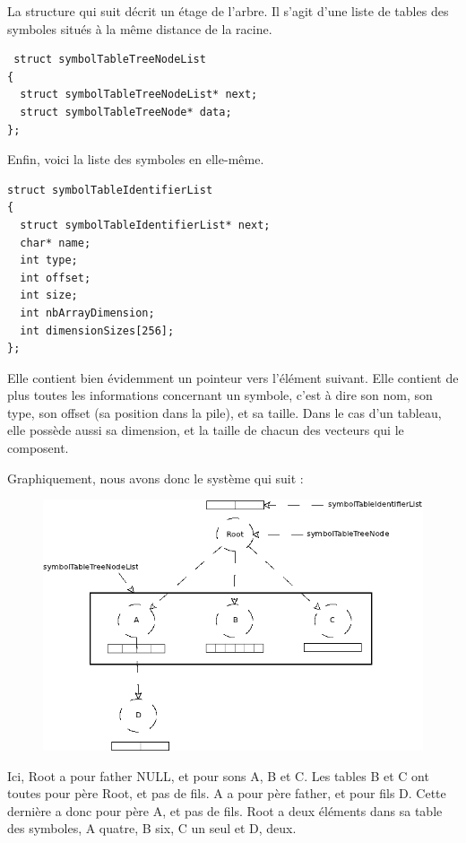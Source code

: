 La structure qui suit décrit un étage de l'arbre. Il s'agit d'une liste de tables des symboles situés à la même distance de la racine.

\begin{verbatim} 
 struct symbolTableTreeNodeList
{
  struct symbolTableTreeNodeList* next;
  struct symbolTableTreeNode* data;
};
\end{verbatim} 

Enfin, voici la liste des symboles en elle-même.

\begin{verbatim}
struct symbolTableIdentifierList
{
  struct symbolTableIdentifierList* next;
  char* name;
  int type;
  int offset;
  int size;
  int nbArrayDimension;
  int dimensionSizes[256];
};
\end{verbatim} 
 
Elle contient bien évidemment un pointeur vers l'élément suivant.
Elle contient de plus toutes les informations concernant un symbole, c'est à dire son nom, son type, son offset (sa position dans la pile), et sa taille.
Dans le cas d'un tableau, elle possède aussi sa dimension, et la taille de chacun des vecteurs qui le composent.

Graphiquement, nous avons donc le système qui suit : 

\begin{figure}[h!]
\includegraphics[scale=0.5]{arbresym}
\end{figure}

Ici, Root a pour father NULL, et pour sons A, B et C.
Les tables B et C ont toutes pour père Root, et pas de fils.
A a pour père father, et pour fils D. Cette dernière a donc pour père A, et pas de fils.
Root a deux éléments dans sa table des symboles, A quatre, B six, C un seul et D, deux.